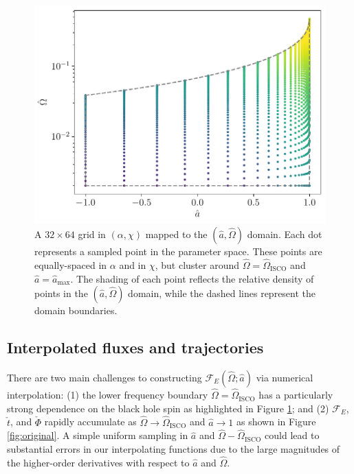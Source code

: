 \documentclass[%
 reprint,
 nofootinbib,
 amsmath,amssymb,
 aps,
 prd,
]{revtex4-2}
\begin{document}
\begin{figure}
    \centering
    \includegraphics[width=0.95\columnwidth]{figures/domain_sampling.pdf}
    \caption{A $32\times 64$ grid in $(\alpha, \chi)$ mapped to the $(\hat{a}, \hat{\Omega})$ domain. Each dot represents a sampled point in the parameter space. These points are equally-spaced in $\alpha$ and in $\chi$, but cluster around $\hat{\Omega} = \hat{\Omega}_\mathrm{ISCO}$ and $\hat{a} = \hat{a}_\mathrm{max}$. The shading of each point reflects the relative density of points in the $(\hat{a}, \hat{\Omega})$ domain, while the dashed lines represent the domain boundaries.}
    \label{fig:domain}
\end{figure}

\subsection{Interpolated fluxes and trajectories}
\label{sec:traj}

There are two main challenges to constructing $\mathcal{F}_E(\hat{\Omega}; \hat{a})$ via numerical interpolation: (1) the lower frequency boundary $\hat{\Omega}=\hat{\Omega}_\mathrm{ISCO}$ has a particularly strong dependence on the black hole spin as highlighted in Figure \ref{fig:domain}; and (2) $\mathcal{F}_E$, $\check{t}$, and $\check{\Phi}$ rapidly accumulate as $\hat{\Omega} \rightarrow \hat{\Omega}_\mathrm{ISCO}$ and $\hat{a} \rightarrow 1$ as shown in Figure \ref{fig:original}. A simple uniform sampling in $\hat{a}$ and $\hat{\Omega}-\hat{\Omega}_\mathrm{ISCO}$ could lead to substantial errors in our interpolating functions due to the large magnitudes of the higher-order derivatives with respect to $\hat{a}$ and $\hat{\Omega}$.
\end{document}
